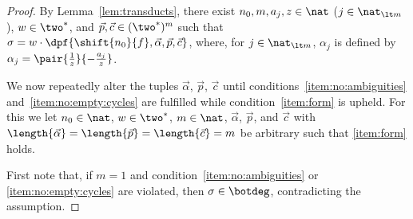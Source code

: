 \begin{proof}By Lemma~\ref{lem:transducts}, 
  there exist $n_0, m, a_j, z \in \nat$ ($j \in \nat_{\lt m}$), 
  $w \in \two^*$, and $\vec{p}, \vec{c} \in (\two^*)^m$ such that 
  $\sigma = w \cdot \dpf{\shift{n_0}{f},\vec{\alpha},\vec{p},\vec{c}}$,
  where, for $j \in \nat_{\lt m}$, $\alpha_j$ is defined by
  $\alpha_j = \pair{\frac{1}{z}}{{-}\frac{a_j}{z}}$.
  
  We now repeatedly alter the tuples $\vec{\alpha}$, $\vec{p}$, $\vec{c}$
  until conditions~\ref{item:no:ambiguities} and~\ref{item:no:empty:cycles} are fulfilled
  while condition~\ref{item:form} is upheld.
  For this we let $n_0 \in \nat$, $w \in\two^*$, $m \in \nat$, $\vec{\alpha}$, $\vec{p}$, and $\vec{c}$ with 
  $\length{\vec{\alpha}} = \length{\vec{p}} = \length{\vec{c}} = m$
  be arbitrary such that \ref{item:form} holds. 


First note that, if $m = 1$ and condition~\ref{item:no:ambiguities} or \ref{item:no:empty:cycles}
  are violated, then $\sigma \in \botdeg$, contradicting the assumption.


\end{proof}
